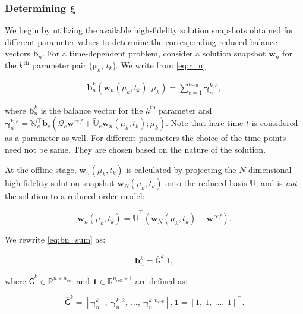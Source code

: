\documentclass[11pt]{article}
\renewcommand{\vec}[1]{\mathbf{#1}}
\newcommand{\mat}[1]{\mathsf{#1}}
\begin{document}
\subsubsection*{Determining $\boldsymbol{\xi}$}

We begin by utilizing the available high-fidelity solution snapshots obtained for different parameter values to determine the corresponding reduced balance vectors $\vec{b}_n$.
For a time-dependent problem, consider a solution snapshot $\vec{w}_n$ for the $k^{\text{th}}$ parameter pair ($\boldsymbol\mu_k$, $t_k$).
We write from \cref{eq:r_n}

\begin{align}
\vec{b}^{k}_n(\vec{w}_n(\mu_k, t_k); \mu_k) = \sum_{e=1}^{n_{\text{cell}}} \boldsymbol{\gamma}^{k,e}_{n},
\label{eq:bn_sum}
\end{align}

where $\vec{b}^{k}_n$ is the balance vector for the $k^{\text{th}}$ parameter and $\boldsymbol{\gamma}^{k,e}_{n} = \mathbb{W}_e^{\top} \vec{b}_e (\mathcal{Q}_e\vec{w}^{ref} + \widetilde{\mathbb{U}}_e \vec{w}_n(\mu_k, t_k); \mu_k)$.
Note that here time $t$ is considered as a parameter as well.
For different parameters the choice of the time-points need not be same.
They are  chosen based on the nature of the solution.


At the offline stage, $\vec{w}_n(\mu_k, t_k)$ is calculated by projecting the $N$-dimensional high-fidelity solution snapshot $\vec{w}_N(\mu_k, t_k)$ onto the reduced basis $\widetilde{\mathbb{U}}$, and is \textit{not} the solution to a reduced order model:

\begin{equation}
\vec{w}_n(\mu_k, t_k) = \widetilde{\mathbb{U}}^{\top} \left(\vec{w}_N(\mu_k, t_k)-\vec{w}^{ref}\right).    
\end{equation}

We rewrite \cref{eq:bn_sum} as:

\begin{equation}
\vec{b}_n^{k} = \bar{\mat{G}}^{k}\, \vec{1},
\label{eq:bn_G1}
\end{equation}

where $\bar{\mat{G}}^k \in \mathbb{R}^{n \times n_{\text{cell}}}$ and $\vec{1} \in \mathbb{R}^{n_{\text{cell}} \times 1}$ are defined as:

\begin{subequations}
\begin{equation}
\bar{\mat{G}}^k = \left[ \boldsymbol{\gamma}_n^{k,1},\ \boldsymbol{\gamma}_n^{k,2},\ \dots,\ \boldsymbol{\gamma}_n^{k,n_{\text{cell}}} \right],
\end{equation}
\begin{equation}
\vec{1} = \left[ 1,\ 1,\ \dots,\ 1 \right]^{\top}.
\end{equation}
\end{subequations}
\end{document}
